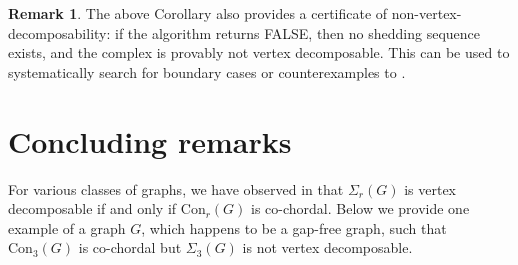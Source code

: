 \documentclass[12pt,reqno]{amsart}
\theoremstyle{definition}
\newtheorem{remark}[proposition]{Remark}
\newcommand{\Con}{{\mathrm{Con}}}
\begin{document}
\begin{remark}\label{non-vd}
    The above Corollary also provides a certificate of non-vertex-decomposability: if the algorithm returns FALSE, then no shedding sequence exists, and the complex is provably not vertex decomposable. This can be used to systematically search for boundary cases or counterexamples to .  
\end{remark}    


    \section{Concluding remarks}\label{con-rem}

	For various classes of graphs, we have observed in  that $\Sigma_{r}(G)$ is vertex decomposable if and only if $\Con_r(G)$ is co-chordal. Below we provide one example of a graph $G$, which happens to be a gap-free graph, such that $\Con_3(G)$ is co-chordal but  $\Sigma_{3}(G)$ is not vertex decomposable.
	
\end{document}
